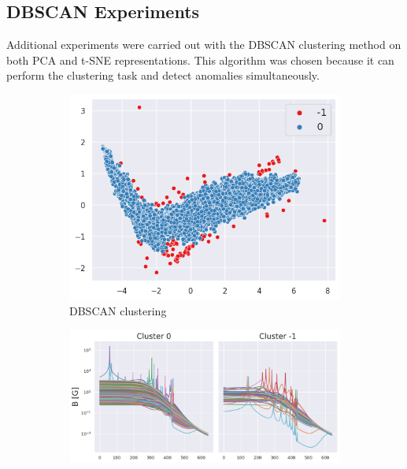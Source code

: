 \subsection{DBSCAN Experiments}\label{sec:dbscan_pca_exp}
Additional experiments were carried out with the DBSCAN clustering method on both PCA and t-SNE representations. This algorithm was chosen because it can perform the clustering task and detect anomalies simultaneously. 

\begin{figure}[]
    \caption[DBSCAN results on PCA of the magnetic field]{DBSCAN results on PCA of $B [G]$. (a) DBSCAN clustering of the PCA of the magnetic field, $B [G]$; (b) magnetic field lines separated by clusters (-1 is the outliers).}
    \begin{subfigure}[h]{0.37\textwidth}
        \centering
        \includegraphics[width=\textwidth]{figures/dbscan_mag.png}
        \caption{DBSCAN clustering}
        \label{fig:dbscan_mag_clusters}
    \end{subfigure}
    \hfill
    \begin{subfigure}[h]{0.62\textwidth}
        \centering
        \includegraphics[width=\textwidth]{figures/dbscan_cluster_repr.png}
        \caption{}%
        \label{fig:mag_dbscan_cluster_real}
    \end{subfigure}
\end{figure}


